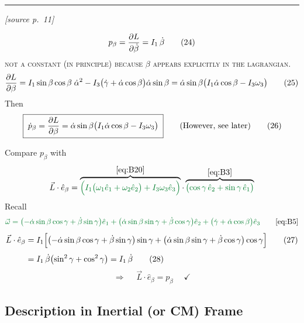 \documentclass[11pt]{article}
\newcommand{\ehat}[1]{\hat{e}_{#1}}
\newcommand{\src}[1]{\par\nobreak\vspace{-4pt}\hfill{\footnotesize\itshape[source p.~#1]}\par\nobreak\vspace{2pt}}
\begin{document}
\bigskip\hrule\bigskip

\src{11}
\begin{equation*}
p_\beta = \frac{\partial L}{\partial \dot{\beta}} = I_1\,\dot{\beta}
\tag{24}\label{eq:B24}
\end{equation*}
\textsc{not a constant (in principle) because} $\beta$ \textsc{appears explicitly in the lagrangian}.
\begin{equation*}
\frac{\partial L}{\partial \beta} = I_1\sin\beta\cos\beta\;\dot{\alpha}^{2}
- I_3\bigl(\dot{\gamma}+\dot{\alpha}\cos\beta\bigr)\dot{\alpha}\sin\beta
= \dot{\alpha}\sin\beta\bigl(I_1\dot{\alpha}\cos\beta - I_3\omega_3\bigr)
\tag{25}\label{eq:B25}
\end{equation*}
Then
\begin{equation*}
\boxed{\;
\dot{p}_\beta = \frac{\partial L}{\partial \beta} = \dot{\alpha}\sin\beta\bigl(I_1\dot{\alpha}\cos\beta - I_3\omega_3\bigr)\;}
\qquad (\text{However, see later})
\tag{26}\label{eq:B26}
\end{equation*}

Compare $p_\beta$ with
\begin{equation*}
\vec{L}\cdot\ehat{\beta}
= \overbrace{\textcolor{lecgreen}{\Bigl(I_1\bigl(\omega_1\ehat{1}+\omega_2\ehat{2}\bigr)+I_3\omega_3\ehat{3}\Bigr)}}^{\eqref{eq:B20}}
\cdot
\overbrace{\textcolor{lecgreen}{\bigl(\cos\gamma\,\ehat{2}+\sin\gamma\,\ehat{1}\bigr)}}^{\eqref{eq:B3}}
\end{equation*}
Recall
\begin{equation*}
\textcolor{lecgreen}{\vec{\omega} = \bigl(-\dot{\alpha}\sin\beta\cos\gamma+\dot{\beta}\sin\gamma\bigr)\ehat{1}
+ \bigl(\dot{\alpha}\sin\beta\sin\gamma+\dot{\beta}\cos\gamma\bigr)\ehat{2}
+ \bigl(\dot{\gamma}+\dot{\alpha}\cos\beta\bigr)\ehat{3}}
\tag*{\eqref{eq:B5}}
\end{equation*}
\begin{align*}
\vec{L}\cdot\ehat{\beta}
&= I_1\Bigl[\bigl(-\dot{\alpha}\sin\beta\cos\gamma+\dot{\beta}\sin\gamma\bigr)\sin\gamma
+ \bigl(\dot{\alpha}\sin\beta\sin\gamma+\dot{\beta}\cos\gamma\bigr)\cos\gamma\Bigr]
\tag{27}\label{eq:B27}\\[4pt]
&= I_1\,\dot{\beta}\bigl(\sin^{2}\gamma+\cos^{2}\gamma\bigr) = I_1\,\dot{\beta}
\tag{28}\label{eq:B28}
\end{align*}
\begin{equation*}
\Longrightarrow\quad
\boxed{\;\vec{L}\cdot\ehat{\beta} = p_\beta\;}\quad\checkmark
\tag{29}\label{eq:B29}
\end{equation*}

\subsection*{Description in Inertial (or CM) Frame}
\end{document}
